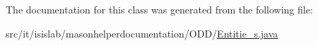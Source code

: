 The documentation for this class was generated from the following file\-:\begin{DoxyCompactItemize}
\item 
src/it/isislab/masonhelperdocumentation/\-O\-D\-D/\hyperlink{_entitie__s_8java}{Entitie\-\_\-s.\-java}\end{DoxyCompactItemize}
